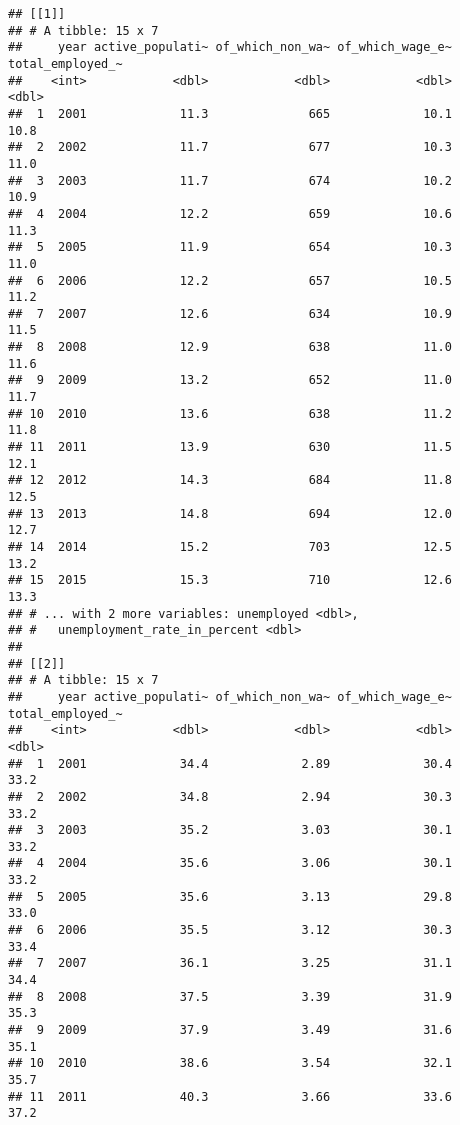 \documentclass[
]{article}
\begin{document}
\begin{verbatim}
## [[1]]
## # A tibble: 15 x 7
##     year active_populati~ of_which_non_wa~ of_which_wage_e~ total_employed_~
##    <int>            <dbl>            <dbl>            <dbl>            <dbl>
##  1  2001             11.3              665             10.1             10.8
##  2  2002             11.7              677             10.3             11.0
##  3  2003             11.7              674             10.2             10.9
##  4  2004             12.2              659             10.6             11.3
##  5  2005             11.9              654             10.3             11.0
##  6  2006             12.2              657             10.5             11.2
##  7  2007             12.6              634             10.9             11.5
##  8  2008             12.9              638             11.0             11.6
##  9  2009             13.2              652             11.0             11.7
## 10  2010             13.6              638             11.2             11.8
## 11  2011             13.9              630             11.5             12.1
## 12  2012             14.3              684             11.8             12.5
## 13  2013             14.8              694             12.0             12.7
## 14  2014             15.2              703             12.5             13.2
## 15  2015             15.3              710             12.6             13.3
## # ... with 2 more variables: unemployed <dbl>,
## #   unemployment_rate_in_percent <dbl>
## 
## [[2]]
## # A tibble: 15 x 7
##     year active_populati~ of_which_non_wa~ of_which_wage_e~ total_employed_~
##    <int>            <dbl>            <dbl>            <dbl>            <dbl>
##  1  2001             34.4             2.89             30.4             33.2
##  2  2002             34.8             2.94             30.3             33.2
##  3  2003             35.2             3.03             30.1             33.2
##  4  2004             35.6             3.06             30.1             33.2
##  5  2005             35.6             3.13             29.8             33.0
##  6  2006             35.5             3.12             30.3             33.4
##  7  2007             36.1             3.25             31.1             34.4
##  8  2008             37.5             3.39             31.9             35.3
##  9  2009             37.9             3.49             31.6             35.1
## 10  2010             38.6             3.54             32.1             35.7
## 11  2011             40.3             3.66             33.6             37.2

\end{verbatim}
\end{document}
